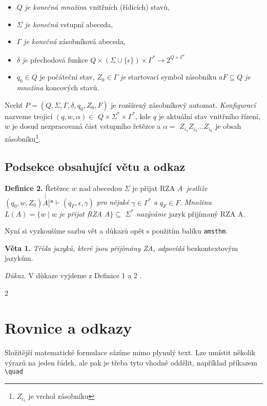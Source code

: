 \documentclass[a4paper, 11pt, twocolumn]{article}
\begin{document}
\begin{itemize}
\item $Q$ \textit{je konečná množin}a vnitřních (řídících) stavů,
\item $\Sigma$ \textit{je konečná} vstupní abeceda,
\item $\Gamma$ \textit{je konečná} zásobníková abeceda,
\item $\delta$ \textit{je} přechodová funkce $Q \times(\Sigma \cup\{\epsilon\}) \times \Gamma^{*} \rightarrow 2^{Q \times \Gamma^{*}}$
\item $q_{0} \in Q$ je počáteční stav, $Z_{0} \in \Gamma$  \textit{je} startovací symbol zásobníku $a F \subseteq Q$ \textit{je množina} koncových stavů.
\end{itemize}

Nechť $P=(Q, \Sigma, \Gamma, \delta, q_{0}, Z_{0}, F)$ je rozšírený zásobníkový automat.
\textit{Konfigurací} nazveme trojici $(q, w, \alpha) \in$ $Q \times \Sigma^{*} \times \Gamma^{*}$,
kde $q$ je aktuální stav vnitřního řízení, $w$ je dosud nezpracovaná část vstupního řetězce a
$\alpha=$ $Z_{i_{1}} Z_{i_{2}} \ldots Z_{i_{k}}$ je obsah zásobníku\footnote{$Z_{i_{1}}$ je vrchol zásobníku}.

\subsection {Podsekce obsahující větu a odkaz }
\textbf{Definice 2.}
Řetězec $w$ nad abecedou $\Sigma$ je přijat RZA 
\textit{A~jestliže} $(q_{0}, w, Z_{0})\stackrel[A]{*}{\vdash}(q_{F}, \epsilon, \gamma)$ \textit{pro nějaké} $\gamma \in \Gamma^{*}$ \textit{a}
$q_{F} \in F.$\textit{ Množinu }$L(A)=\{w \mid w$ \textit{je přijat RZA} $A\} \subseteq$ $\Sigma^{*}$ \textit{nazýváme} jazyk přijímaný RZA A.

Nyní si vyzkoušíme sazbu vět a důkazů opět s použitím balíku \verb=amsthm=.

\medskip
\noindent\textbf{Věta 1.} \textit{Třída jazyků, které jsou přijímány ZA, odpovídá} bezkontextovým jazykům.

\medskip
\noindent\textit{Důkaz.} V dùkaze vyjdeme z Definice 1 a 2 .

2\section{Rovnice a odkazy}
Složitější matematické formulace sázíme mimo plynulý text. Lze umístit několik výrazů na jeden řádek, ale pak je třeba tyto vhodně oddělit, například příkazem \verb=\quad=
\end{document}
